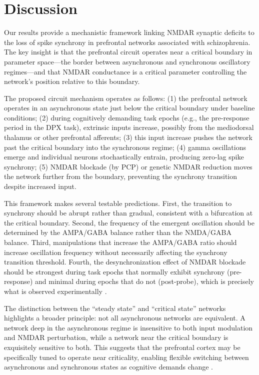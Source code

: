 \documentclass[11pt]{article}
\begin{document}
\section{Discussion}

Our results provide a mechanistic framework linking NMDAR synaptic deficits to the loss of spike synchrony in prefrontal networks associated with schizophrenia. The key insight is that the prefrontal circuit operates near a critical boundary in parameter space---the border between asynchronous and synchronous oscillatory regimes---and that NMDAR conductance is a critical parameter controlling the network's position relative to this boundary.

The proposed circuit mechanism operates as follows: (1) the prefrontal network operates in an asynchronous state just below the critical boundary under baseline conditions; (2) during cognitively demanding task epochs (e.g., the pre-response period in the DPX task), extrinsic inputs increase, possibly from the mediodorsal thalamus or other prefrontal afferents; (3) this input increase pushes the network past the critical boundary into the synchronous regime; (4) gamma oscillations emerge and individual neurons stochastically entrain, producing zero-lag spike synchrony; (5) NMDAR blockade (by PCP) or genetic NMDAR reduction moves the network further from the boundary, preventing the synchrony transition despite increased input.

This framework makes several testable predictions. First, the transition to synchrony should be abrupt rather than gradual, consistent with a bifurcation at the critical boundary. Second, the frequency of the emergent oscillation should be determined by the AMPA/GABA balance rather than the NMDA/GABA balance. Third, manipulations that increase the AMPA/GABA ratio should increase oscillation frequency without necessarily affecting the synchrony transition threshold. Fourth, the desynchronization effect of NMDAR blockade should be strongest during task epochs that normally exhibit synchrony (pre-response) and minimal during epochs that do not (post-probe), which is precisely what is observed experimentally \citep{zick2018blocking}.

The distinction between the ``steady state'' and ``critical state'' networks highlights a broader principle: not all asynchronous networks are equivalent. A network deep in the asynchronous regime is insensitive to both input modulation and NMDAR perturbation, while a network near the critical boundary is exquisitely sensitive to both. This suggests that the prefrontal cortex may be specifically tuned to operate near criticality, enabling flexible switching between asynchronous and synchronous states as cognitive demands change \citep{uhlhaas2010neural, fries2015rhythms, buzsaki2012gamma}.
\end{document}
